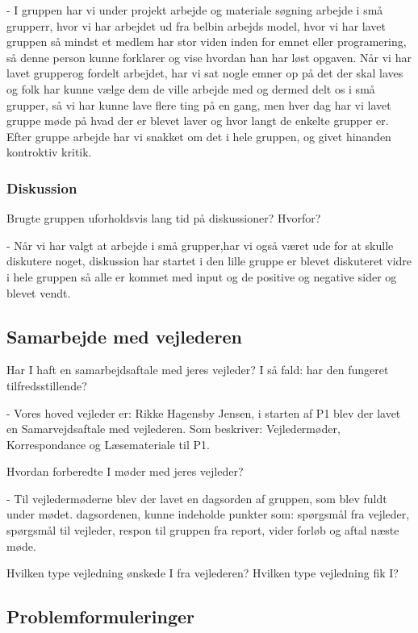 \documentclass[a4paper,12pt,twoside,openright]{memoir}
\begin{document}
            - I gruppen har vi under projekt arbejde og materiale søgning arbejde i små grupperr, hvor vi har arbejdet ud fra belbin arbejds model, hvor vi har lavet  gruppen så mindst et medlem har stor viden inden for emnet eller programering, så denne person kunne forklarer og vise hvordan han har løst opgaven. Når vi har lavet grupperog fordelt arbejdet, har vi sat nogle emner op på det der skal laves og folk har kunne vælge dem de ville arbejde med og dermed delt os i små grupper, så vi har kunne lave flere ting på en gang, men hver dag har vi lavet gruppe møde på hvad der er blevet laver  og hvor langt de enkelte grupper er. Efter gruppe arbejde har vi snakket  om det i hele  gruppen, og givet  hinanden kontroktiv kritik.
         
            \subsubsection{Diskussion}
            Brugte gruppen uforholdsvis lang tid på diskussioner? Hvorfor?

            - Når vi har valgt at arbejde i små grupper,har vi også været ude for at skulle diskutere noget, diskussion har startet i den lille gruppe er blevet diskuteret vidre i hele gruppen så alle er kommet med input og de positive og negative sider og blevet vendt. 

            \subsection{Samarbejde med vejlederen}
            Har I haft en samarbejdsaftale med jeres vejleder? I så fald: har den fungeret tilfredsstillende?

            - Vores hoved vejleder er: Rikke Hagensby Jensen, i starten af P1 blev der lavet en Samarvejdsaftale med vejlederen. Som beskriver: Vejledermøder, Korrespondance og Læsemateriale til P1.

            Hvordan forberedte I møder med jeres vejleder?

            - Til vejledermøderne blev der lavet en dagsorden af gruppen, som blev fuldt under mødet. dagsordenen, kunne indeholde punkter som: spørgsmål fra vejleder, spørgsmål til vejleder, respon til gruppen fra report, vider forløb og aftal næste møde.

Hvilken type vejledning ønskede I fra vejlederen? Hvilken type vejledning fik I?  

        \subsection{Problemformuleringer}
\end{document}
